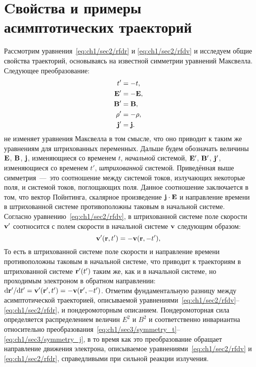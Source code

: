\section{Cвойства и примеры асимптотических траекторий}
\label{sec:ch1/sec4/Properties}
Рассмотрим уравнения~\eqref{eq:ch1/sec2/rfdr} и \eqref{eq:ch1/sec2/rfdv} и исследуем общие свойства траекторий, основываясь на известной симметрии уравнений Максвелла. Следующее преобразование:
\begin{align}
    \label{eq:ch1/sec3/symmetry_t}
    t' &= - t, \\
    \label{eq:ch1/sec3/symmetry_E}
    \vb{E}' &= -\vb{E}, \\
    \label{eq:ch1/sec3/symmetry_B}
    \vb{B}' &= \vb{B}, \\
    \label{eq:ch1/sec3/symmetry_rho}
    \rho' &= -\rho, \\
    \label{eq:ch1/sec3/symmetry_j}
    \vb{j}' &= \vb{j}.
\end{align}
не изменяет уравнения Максвелла в том смысле, что оно приводит к таким же уравнениям для штрихованных переменных. Дальше будем обозначать величины $\vb{E}$, $\vb{B}$, $\vb{j}$, изменяющиеся со временем $t$, \textit{начальной} системой, $\vb{E}'$, $\vb{B}'$, $\vb{j}'$, изменяющиеся со временем $t'$, \textit{штрихованной} системой. Приведённая выше симметрия~---~это соотношение между системой токов, излучающих некоторые поля, и системой токов, поглощающих поля. Данное соотношение заключается в том, что вектор Пойнтинга, скалярное произведение $\vb{j \cdot E}$ и направление времени в штрихованной системе противоположны таковым в начальной системе.
Согласно уравнению~\eqref{eq:ch1/sec2/rfdv}, в штрихованной системе поле скорости $\vb{v}'$ соотносится с полем скорости в начальной системе $\vb{v}$ следующим образом:
\begin{equation}
    \label{eq:ch1/sec3/symmetry_v}
    \vb{v}'(\vb{r}, t') = -\vb{v}(\vb{r}, -t'),
\end{equation}
То есть в штрихованной системе поле скорости и направление времени противоположны таковым в начальной системе, что приводит к траекториям в штрихованной системе $\vb{r}'(t')$ таким же, как и в начальной системе, но проходимым электроном в обратном направлении:
$\dd \vb{r}' / \dd t' = \vb{v}'(\vb{r}', t') = -\vb{v}(\vb{r}', -t')$.
Отметим фундаментальную разницу между асимптотической траекторией, описываемой уравнениями~\eqref{eq:ch1/sec2/rfdv}--\eqref{eq:ch1/sec2/rfdr}, и пондеромоторным описанием. Пондеромоторная сила определяется распределением величин $E^2$ и $B^2$ и соответственно инвариантна относительно преобразования~\eqref{eq:ch1/sec3/symmetry_t}--\eqref{eq:ch1/sec3/symmetry_j}, в то время как это преобразование обращает направление движения электрона, описываемое уравнениями~\eqref{eq:ch1/sec2/rfdv} и \eqref{eq:ch1/sec2/rfdr}, справедливыми при сильной реакции излучения.

